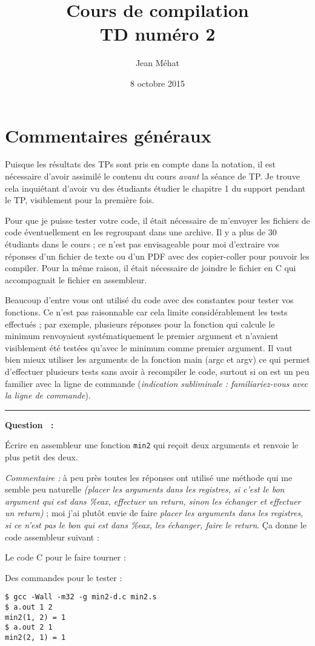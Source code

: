 \documentclass{article}
\title{Cours de compilation\\ TD numéro 2}
\date{8 octobre 2015}
\author{Jean Méhat}
\newcounter{questionnumero}
\newcommand{\Question}{{\vspace{2mm}\hrule\vspace{2mm} \bf Question \arabic{questionnumero}~:~}\stepcounter{questionnumero}}
\begin{document}
\maketitle

\section*{Commentaires généraux}

Puisque les résultats des TPs sont pris en compte dans la notation, il
est nécessaire d'avoir assimilé le contenu du cours {\em avant} la
séance de TP. Je trouve cela inquiétant d'avoir vu des étudiants
étudier le chapitre 1 du support pendant le TP, visiblement pour la
première fois.

Pour que je puisse tester votre code, il était nécessaire de m'envoyer
les fichiers de code éventuellement en les regroupant dans une
archive.  Il y a plus de 30 étudiants dans le cours ; ce n'est pas
envisageable pour moi d'extraire vos réponses d'un fichier de texte ou
d'un PDF avec des copier-coller pour pouvoir les compiler.  Pour la
même raison, il était nécessaire de joindre le fichier en C qui
accompagnait le fichier en assembleur.

Beaucoup d'entre vous ont utilisé du code avec des constantes pour
tester vos fonctions. Ce n'est pas raisonnable car cela limite
considérablement les tests effectués ; par exemple, plusieurs réponses
pour la fonction qui calcule le minimum renvoyaient systématiquement
le premier argument et n'avaient visiblement été testées qu'avec le
minimum comme premier argument. Il vaut bien mieux utiliser les
arguments de la fonction main (argc et argv) ce qui permet d'effectuer
plusieurs tests sans avoir à recompiler le code, surtout si on est un
peu familier avec la ligne de commande ({\em indication subliminale :
  familiariez-vous avec la ligne de commande}).



\Question Écrire en assembleur une fonction {\tt min2} qui reçoit deux
arguments et renvoie le plus petit des deux.

{\em Commentaire :}
à peu près toutes les réponses ont utilisé une méthode qui me semble peu
naturelle {\em (placer les arguments dans les registres, si c'est le bon
  argument qui est dans \%eax, effectuer un return, sinon les échanger
  et effectuer un return)} ; moi j'ai plutôt envie de faire {\em placer
  les arguments dans les registres, si ce n'est pas le bon qui est dans
  \%eax, les échanger, faire le return}.
Ça donne le code assembleur suivant :

Le code C pour le faire tourner :

Des commandes pour le tester :
\begin{verbatim}
$ gcc -Wall -m32 -g min2-d.c min2.s
$ a.out 1 2
min2(1, 2) = 1
$ a.out 2 1
min2(2, 1) = 1
\end{verbatim}
\end{document}
